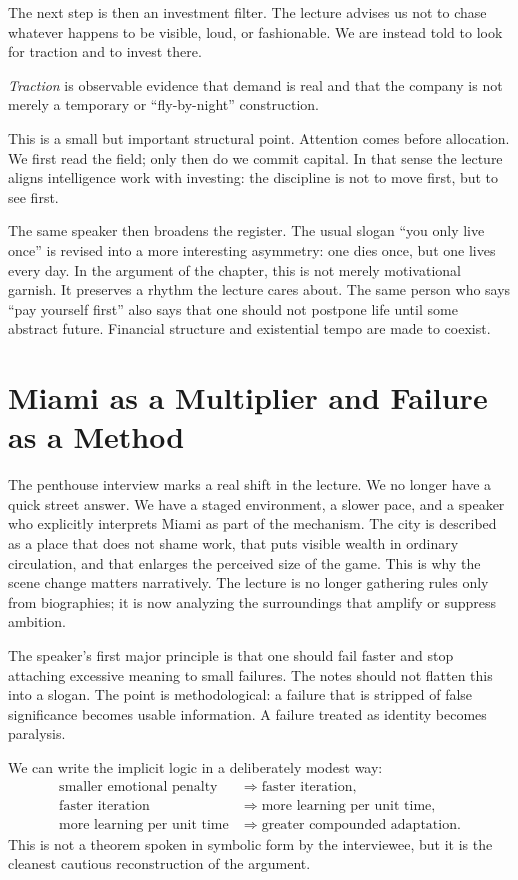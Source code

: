 The next step is then an investment filter. The lecture advises us not to chase whatever happens to be visible, loud, or fashionable. We are instead told to look for traction and to invest there.

\begin{definition}
\emph{Traction} is observable evidence that demand is real and that the company is not merely a temporary or ``fly-by-night'' construction.
\end{definition}

This is a small but important structural point. Attention comes before allocation. We first read the field; only then do we commit capital. In that sense the lecture aligns intelligence work with investing: the discipline is not to move first, but to see first.

The same speaker then broadens the register. The usual slogan ``you only live once'' is revised into a more interesting asymmetry: one dies once, but one lives every day. In the argument of the chapter, this is not merely motivational garnish. It preserves a rhythm the lecture cares about. The same person who says ``pay yourself first'' also says that one should not postpone life until some abstract future. Financial structure and existential tempo are made to coexist.

\section{Miami as a Multiplier and Failure as a Method}

The penthouse interview marks a real shift in the lecture. We no longer have a quick street answer. We have a staged environment, a slower pace, and a speaker who explicitly interprets Miami as part of the mechanism. The city is described as a place that does not shame work, that puts visible wealth in ordinary circulation, and that enlarges the perceived size of the game. This is why the scene change matters narratively. The lecture is no longer gathering rules only from biographies; it is now analyzing the surroundings that amplify or suppress ambition.

The speaker's first major principle is that one should fail faster and stop attaching excessive meaning to small failures. The notes should not flatten this into a slogan. The point is methodological: a failure that is stripped of false significance becomes usable information. A failure treated as identity becomes paralysis.

We can write the implicit logic in a deliberately modest way:
\begin{align}
\text{smaller emotional penalty} &\Rightarrow \text{faster iteration},\\
\text{faster iteration} &\Rightarrow \text{more learning per unit time},\\
\text{more learning per unit time} &\Rightarrow \text{greater compounded adaptation}.
\end{align}
This is not a theorem spoken in symbolic form by the interviewee, but it is the cleanest cautious reconstruction of the argument.

